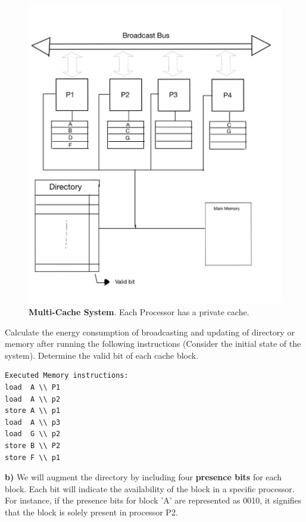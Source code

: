 \begin{figure}[!h]
    \centering
    \includegraphics[scale=0.23]{5_a.png}
    \caption{\textbf{Multi-Cache System}. Each Processor has a private cache.}
    \label{fig:enter-label}
\end{figure}


Calculate the energy consumption of broadcasting and updating of directory or memory after running the following instructions (Consider the initial state of the system). Determine the valid bit of each cache block.


\begin{verbatim}
Executed Memory instructions:
load  A \\ P1
load  A \\ p2
store A \\ p1
load  A \\ p3
load  G \\ p2
store B \\ P2
store F \\ p1
\end{verbatim}


\textbf{b) }We will augment the directory by including four \textbf{presence bits} for each block. Each bit will indicate the availability of the block in a specific processor. For instance, if the presence bits for block 'A' are represented as 0010, it signifies that the block is solely present in processor P2. 

